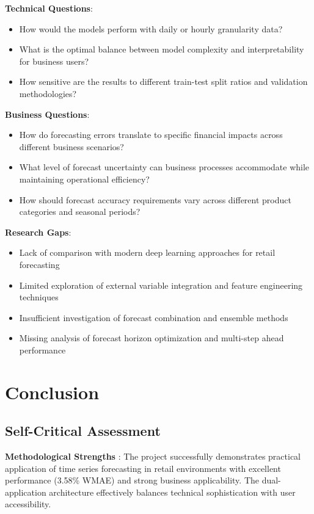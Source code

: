 \textbf{Technical Questions}:
\begin{itemize}
	\item How would the models perform with daily or hourly granularity data?
	\item What is the optimal balance between model complexity and interpretability for business users?
	\item How sensitive are the results to different train-test split ratios and validation methodologies?
\end{itemize}

\textbf{Business Questions}:
\begin{itemize}
	\item How do forecasting errors translate to specific financial impacts across different business scenarios?
	\item What level of forecast uncertainty can business processes accommodate while maintaining operational efficiency?
	\item How should forecast accuracy requirements vary across different product categories and seasonal periods?
\end{itemize}

\textbf{Research Gaps}:
\begin{itemize}
	\item Lack of comparison with modern deep learning approaches for retail forecasting
	\item Limited exploration of external variable integration and feature engineering techniques
	\item Insufficient investigation of forecast combination and ensemble methods
	\item Missing analysis of forecast horizon optimization and multi-step ahead performance
\end{itemize}

\chapter{Conclusion}

\section{Self-Critical Assessment}

\textbf{Methodological Strengths }: The project successfully demonstrates practical application of time series forecasting in retail environments with excellent performance (3.58\% WMAE) and strong business applicability. The dual-application architecture effectively balances technical sophistication with user accessibility.

